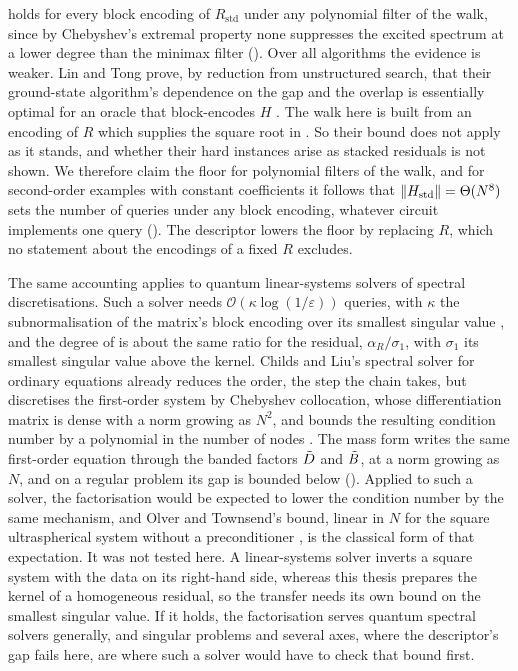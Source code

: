  holds for every block encoding of $R_{\mathrm{std}}$ under any polynomial filter of the walk, since by Chebyshev's extremal property none suppresses the excited spectrum at a lower degree than the minimax filter (). Over all algorithms the evidence is weaker. Lin and Tong prove, by reduction from unstructured search, that their ground-state algorithm's dependence on the gap and the overlap is essentially optimal for an oracle that block-encodes $H$ \cite{lintong2020groundstate}. The walk here is built from an encoding of $R$ which supplies the square root in . So their bound does not apply as it stands, and whether their hard instances arise as stacked residuals is not shown. We therefore claim the floor for polynomial filters of the walk, and for second-order examples with constant coefficients it follows that $\|H_{\mathrm{std}}\|=\Theta(N^8)$ sets the number of queries under any block encoding, whatever circuit implements one query (). The descriptor lowers the floor by replacing $R$, which no statement about the encodings of a fixed $R$ excludes.

The same accounting applies to quantum linear-systems solvers of spectral discretisations. Such a solver needs $\mathcal O(\kappa\log(1/\varepsilon))$ queries, with $\kappa$ the subnormalisation of the matrix's block encoding over its smallest singular value \cite{costa2022optimal}, and the degree of  is about the same ratio for the residual, $\alpha_R/\sigma_1$, with $\sigma_1$ its smallest singular value above the kernel. Childs and Liu's spectral solver for ordinary equations already reduces the order, the step the chain takes, but discretises the first-order system by Chebyshev collocation, whose differentiation matrix is dense with a norm growing as $N^2$, and bounds the resulting condition number by a polynomial in the number of nodes \cite{childsliu2020spectral}. The mass form writes the same first-order equation through the banded factors $\tilde{D}$ and $\tilde{B}$, at a norm growing as $N$, and on a regular problem its gap is bounded below (). Applied to such a solver, the factorisation would be expected to lower the condition number by the same mechanism, and Olver and Townsend's bound, linear in $N$ for the square ultraspherical system without a preconditioner \cite{olver2013}, is the classical form of that expectation. It was not tested here. A linear-systems solver inverts a square system with the data on its right-hand side, whereas this thesis prepares the kernel of a homogeneous residual, so the transfer needs its own bound on the smallest singular value. If it holds, the factorisation serves quantum spectral solvers generally, and singular problems and several axes, where the descriptor's gap fails here, are where such a solver would have to check that bound first.

